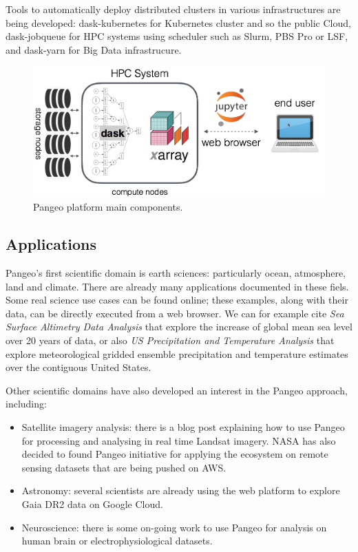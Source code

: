 \documentclass{article}
\begin{document}
Tools to automatically deploy distributed clusters in various infrastructures are being developed: dask-kubernetes for Kubernetes cluster and so the public Cloud, dask-jobqueue\cite{b4} for HPC systems using scheduler such as Slurm, PBS Pro or LSF, and dask-yarn for Big Data infrastrucure.

\begin{figure}
  \centering
  \includegraphics[width=\columnwidth]{pangeo_stack.png}
  \caption{\label{pangeo_stack} Pangeo platform main components.}
\end{figure}

\subsection{Applications}
\label{ssec:applications}

Pangeo's first scientific domain is earth sciences: particularly ocean, atmosphere, land and climate. There are already many  applications documented in these fiels. Some real science use cases can be found online\cite{b5}; these examples, along with their data, can be directly executed from a web browser. We can for example cite \textit{Sea Surface Altimetry Data Analysis} that explore the increase of global mean sea level over 20 years of data, or also \textit{US Precipitation and Temperature Analysis} that explore meteorological gridded ensemble precipitation and temperature estimates over the contiguous United States.

Other scientific domains have also developed an interest in the Pangeo approach, including:
\begin{itemize}
\item Satellite imagery analysis: there is a blog post\cite{b6} explaining how to use Pangeo for processing and analysing in real time Landsat imagery. NASA has also decided to found Pangeo initiative for applying the ecosystem on remote sensing datasets that are being pushed on AWS.
\item Astronomy: several scientists are already using the web platform to explore Gaia DR2 data on Google Cloud.
\item Neuroscience: there is some on-going work to use Pangeo for analysis on human brain or electrophysiological datasets.
\end{itemize}
\end{document}
